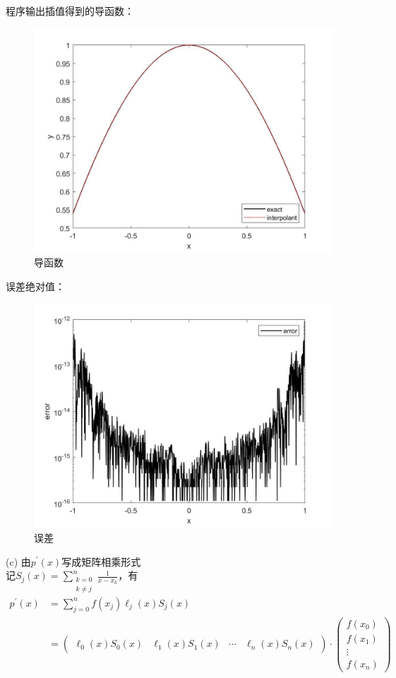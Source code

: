 \documentclass[12pt,a4paper,utf8]{ctexart}
\begin{document}
\begin{enumerate}
程序输出插值得到的导函数：

\begin{figure}[H]
    \centering
    \includegraphics[width = .8\textwidth]{2b_interp.jpg}
    \caption{导函数}
\end{figure}

误差绝对值：

\begin{figure}[H]
    \centering
    \includegraphics[width = .8\textwidth]{2b_error.jpg}
    \caption{误差}
\end{figure}

\subitem(c)
由$p^{'}(x)$写成矩阵相乘形式\\
记$S_j(x) = \sum_{\substack{k=0\\k \neq j}}^{n} \frac{1}{x-x_k}$，有
\begin{equation}
    \begin{aligned}
        p^{'}(x) &= \sum_{j=0}^{n} f(x_j)\ell_j(x)S_j(x) \\
        &= \begin{pmatrix}
            \ell_0(x)S_0(x) & \ell_1(x)S_1(x) & \cdots & \ell_n(x)S_n(x)
        \end{pmatrix} \cdot \begin{pmatrix}
            f(x_0) \\
            f(x_1) \\
            \vdots \\
            f(x_n)
        \end{pmatrix}
    \end{aligned}
\end{equation}


\end{enumerate}
\end{document}
